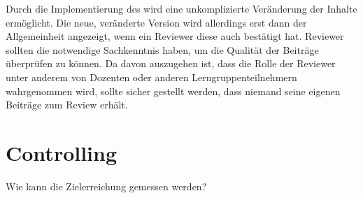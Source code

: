 Durch die Implementierung des  wird eine unkomplizierte Veränderung der Inhalte ermöglicht. Die neue, veränderte Version wird allerdings erst dann der Allgemeinheit angezeigt, wenn ein Reviewer diese auch bestätigt hat. Reviewer sollten die notwendige Sachkenntnis haben, um die Qualität der Beiträge überprüfen zu können.  Da davon auszugehen ist, dass die Rolle der Reviewer unter anderem von Dozenten oder anderen Lerngruppenteilnehmern wahrgenommen wird, sollte sicher gestellt werden, dass niemand seine eigenen Beiträge zum Review erhält.



\section{Controlling} %
\label{sec:controlling}
Wie kann die Zielerreichung gemessen werden?
